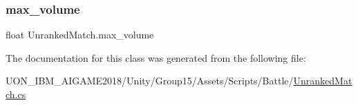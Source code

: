 \mbox{\label{class_unranked_match_a5aa53fa5b0f4ff0b942fd905beea8c6e}} 
\subsubsection{\texorpdfstring{max\_volume}{max\_volume}}
{\footnotesize\ttfamily float Unranked\+Match.\+max\+\_\+volume\hspace{0.3cm}{\ttfamily [private]}}



The documentation for this class was generated from the following file\+:\begin{DoxyCompactItemize}
\item 
U\+O\+N\+\_\+\+I\+B\+M\+\_\+\+A\+I\+G\+A\+M\+E2018/\+Unity/\+Group15/\+Assets/\+Scripts/\+Battle/\mbox{\hyperlink{_unranked_match_8cs}{Unranked\+Match.\+cs}}\end{DoxyCompactItemize}
